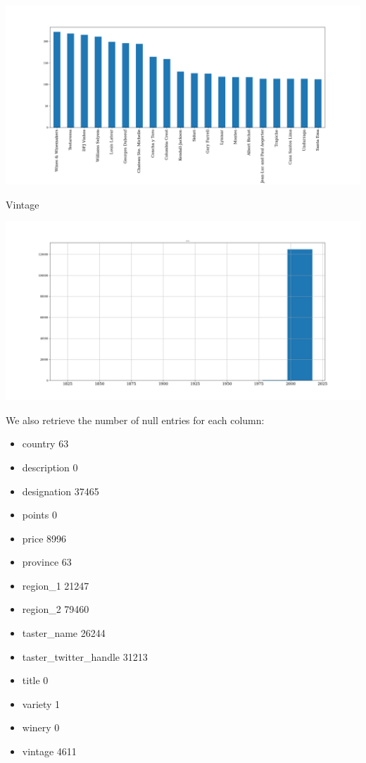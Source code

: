 \documentclass[11pt]{article}
\begin{document}
\includegraphics[width=\textwidth,height=\textheight,keepaspectratio]{figures/1c_histogram_of_winery.png}

Vintage

\includegraphics[width=\textwidth,height=\textheight,keepaspectratio]{figures/1c_histogram_of_vintage.png}

We also retrieve the number of null entries for each column:

\begin{itemize}
    \item country                     63
    \item description                  0
    \item designation              37465
    \item points                       0
    \item price                     8996
    \item province                    63
    \item region\_1                 21247
    \item region\_2                 79460
    \item taster\_name              26244
    \item taster\_twitter\_handle    31213
    \item title                        0
    \item variety                      1
    \item winery                       0
    \item vintage                   4611
\end{itemize}
\end{document}
